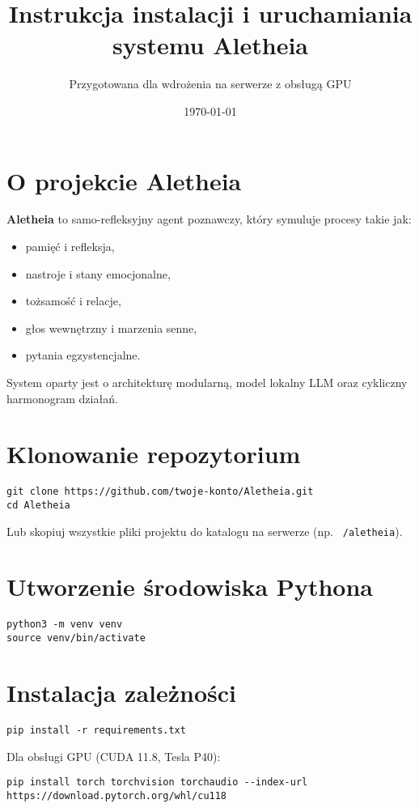\documentclass[12pt]{article}
\title{\textbf{Instrukcja instalacji i uruchamiania systemu Aletheia}}
\author{Przygotowana dla wdrożenia na serwerze z obsługą GPU}
\date{\today}
\begin{document}
\maketitle

\section*{O projekcie Aletheia}
\textbf{Aletheia} to samo-refleksyjny agent poznawczy, który symuluje procesy takie jak:
\begin{itemize}
  \item pamięć i refleksja,
  \item nastroje i stany emocjonalne,
  \item tożsamość i relacje,
  \item głos wewnętrzny i marzenia senne,
  \item pytania egzystencjalne.
\end{itemize}

System oparty jest o architekturę modularną, model lokalny LLM oraz cykliczny harmonogram działań.

\section{Klonowanie repozytorium}
\begin{lstlisting}
git clone https://github.com/twoje-konto/Aletheia.git
cd Aletheia
\end{lstlisting}

Lub skopiuj wszystkie pliki projektu do katalogu na serwerze (np. \texttt{~/aletheia}).

\section{Utworzenie środowiska Pythona}
\begin{lstlisting}
python3 -m venv venv
source venv/bin/activate
\end{lstlisting}

\section{Instalacja zależności}
\begin{lstlisting}
pip install -r requirements.txt
\end{lstlisting}

Dla obsługi GPU (CUDA 11.8, Tesla P40):
\begin{lstlisting}
pip install torch torchvision torchaudio --index-url https://download.pytorch.org/whl/cu118
\end{lstlisting}
\end{document}
